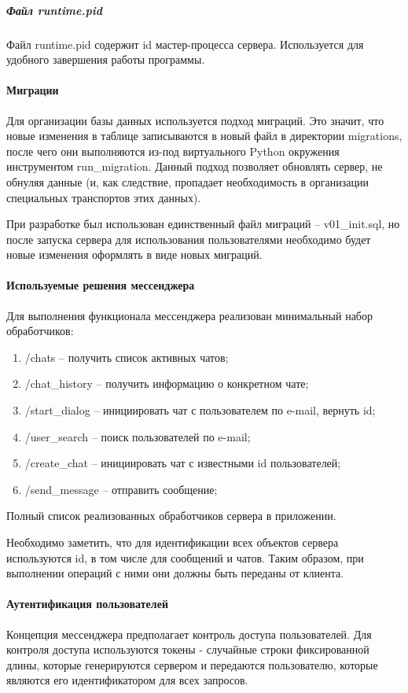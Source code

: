 \documentclass[explnote]{espd}
\begin{document}
\subparagraph{Файл runtime.pid}
Файл runtime.pid содержит id мастер-процесса сервера. Используется для удобного завершения работы программы.

\paragraph{Миграции}
Для организации базы данных используется подход миграций. Это значит, что новые изменения в таблице записываются в новый файл в директории migrations, после чего они выполняются из-под виртуального Python окружения инструментом run\_migration. Данный подход позволяет обновлять сервер, не обнуляя данные (и, как следствие, пропадает необходимость в организации специальных транспортов этих данных).

При разработке был использован единственный файл миграций -- v01\_init.sql, но после запуска сервера для использования пользователями необходимо будет новые изменения оформлять в виде новых миграций.

\paragraph{Используемые решения мессенджера}
Для выполнения функционала мессенджера реализован минимальный набор обработчиков:

\begin{enumerate}
\item /chats -- получить список активных чатов;
\item /chat\_history -- получить информацию о конкретном чате;
\item /start\_dialog -- инициировать чат с пользователем по e-mail, вернуть id;
\item /user\_search -- поиск пользователей по e-mail;
\item /create\_chat -- инициировать чат с известными id пользователей;
\item /send\_message -- отправить сообщение;
\end{enumerate}

Полный список реализованных обработчиков сервера в приложении.

Необходимо заметить, что для идентификации всех объектов сервера используются id, в том числе для сообщений и чатов. Таким образом, при выполнении операций с ними они должны быть переданы от клиента.

\paragraph{Аутентификация пользователей}
Концепция мессенджера предполагает контроль доступа пользователей. Для контроля доступа используются токены - случайные строки фиксированной длины, которые генерируются сервером и передаются пользователю, которые являются его идентификатором для всех запросов.
\end{document}
